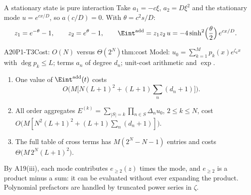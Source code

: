 \begin{example}{A stationary state is pure interaction}
Take $a_1=-c\xi$, $a_2=D\xi^2$ and the stationary mode $u=e^{cx/D}$, so $a(c/D)=0$. With $\theta=c^2s/D$:
\[
z_1=e^{-\theta}-1,\qquad z_2=e^{\theta}-1,\qquad
\Eint^{\mathrm{add}}=z_1z_2\,u=-4\sinh^2\!\Big(\frac\theta2\Big)\,e^{cx/D}.
\]
\end{example}

\begin{dimcard}{A20}{P1-T3}{Cost: $O(N)$ versus $\Theta(2^N)$}{\proved}{thm:cost}
Model: $u_0=\sum_{k=1}^Mp_k(x)e^{\zeta_kx}$ with $\deg p_k\le L$; terms $a_n$ of degree $d_n$; unit-cost arithmetic and $\exp$.
\begin{enumerate}[label=(\alph*)]
\item One value of $\Eint^{\mathrm{add}}(t)$ costs
\[
O\Big(M\big[N(L+1)^2+(L+1)\textstyle\sum_n(d_n+1)\big]\Big).
\]
\item All order aggregates $E^{(k)}=\sum_{|S|=k}\prod_{n\in S}\Delta_nu_0$, $2\le k\le N$, cost $O\big(M[N^2(L+1)^2+(L+1)\sum_n(d_n+1)]\big)$.
\item The full table of cross terms has $M(2^N-N-1)$ entries and costs $\Theta\big(M\,2^N(L+1)^2\big)$.
\end{enumerate}
\end{dimcard}

\begin{proofidea}
By A19(iii), each mode contributes $e_{\ge2}(z)$ times the mode, and $e_{\ge2}$ is a product minus a sum: it can be evaluated without ever expanding the product. Polynomial prefactors are handled by truncated power series in $\zeta$.
\end{proofidea}

